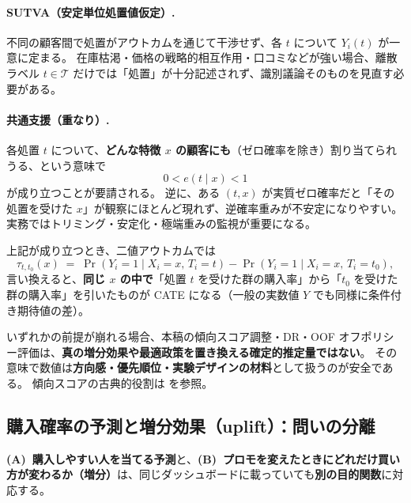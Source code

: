\documentclass[11pt,a4paper]{article}
\begin{document}
\paragraph{SUTVA（安定単位処置値仮定）.}
不同の顧客間で処置がアウトカムを通じて干渉せず、各 $t$ について $Y_i(t)$ が一意に定まる。
在庫枯渇・価格の戦略的相互作用・口コミなどが強い場合、離散ラベル $t\in\mathcal{T}$ だけでは「処置」が十分記述されず、識別議論そのものを見直す必要がある。

\paragraph{共通支援（重なり）.}
各処置 $t$ について、\textbf{どんな特徴 $x$ の顧客にも}（ゼロ確率を除き）割り当てられうる、という意味で
\begin{equation}
  0 < e(t \mid x) < 1
  \label{eq:overlap}
\end{equation}
が成り立つことが要請される。
逆に、ある $(t,x)$ が実質ゼロ確率だと「その処置を受けた $x$」が観察にほとんど現れず、逆確率重みが不安定になりやすい。実務ではトリミング・安定化・極端重みの監視が重要になる。

上記が成り立つとき、二値アウトカムでは
\begin{equation}
  \tau_{t,t_0}(x)
  \;=\;
  \Pr(Y_i=1 \mid X_i=x,\, T_i=t) - \Pr(Y_i=1 \mid X_i=x,\, T_i=t_0),
  \label{eq:cate_binary_condmean}
\end{equation}
言い換えると、\textbf{同じ $x$ の中で}「処置 $t$ を受けた群の購入率」から「$t_0$ を受けた群の購入率」を引いたものが CATE になる（一般の実数値 $Y$ でも同様に条件付き期待値の差）。

いずれかの前提が崩れる場合、本稿の傾向スコア調整・DR・OOF オフポリシー評価は、\textbf{真の増分効果や最適政策を置き換える確定的推定量ではない}。
その意味で数値は\textbf{方向感・優先順位・実験デザインの材料}として扱うのが安全である。
傾向スコアの古典的役割は \cite{Rosenbaum1983} を参照。

\subsection{購入確率の予測と増分効果（uplift）：問いの分離}
\label{sec:pred_vs_uplift}
\textbf{(A)~購入しやすい人を当てる予測}と、\textbf{(B)~プロモを変えたときにどれだけ買い方が変わるか（増分）}は、同じダッシュボードに載っていても\textbf{別の目的関数}に対応する。
\end{document}
